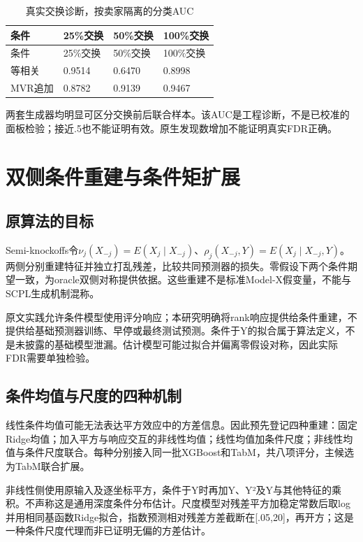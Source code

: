 \documentclass{sufethesismas}
\begin{document}
{
\footnotesize
\begin{longtable}[]{@{}llll@{}}
\caption{真实交换诊断，按卖家隔离的分类AUC}\tabularnewline
\toprule\noalign{}
条件 & 25\%交换 & 50\%交换 & 100\%交换 \\
\midrule\noalign{}
\endfirsthead
\toprule\noalign{}
条件 & 25\%交换 & 50\%交换 & 100\%交换 \\
\midrule\noalign{}
\endhead
\bottomrule\noalign{}
\endlastfoot
等相关 & 0.9514 & 0.6470 & 0.8998 \\
MVR追加 & 0.8782 & 0.9139 & 0.9467 \\
\end{longtable}
}

两套生成器均明显可区分交换前后联合样本。该AUC是工程诊断，不是已校准的面板检验；接近.5也不能证明有效。原生发现数增加不能证明真实FDR正确。

\chapter{双侧条件重建与条件矩扩展}

\section{原算法的目标}

Semi-knockoffs令\(\nu_j(X_{-j})=E(X_j\mid X_{-j})\)、\(\rho_j(X_{-j},Y)=E(X_j\mid X_{-j},Y)\)。两侧分别重建特征并独立打乱残差，比较共同预测器的损失。零假设下两个条件期望一致，为oracle双侧对称提供依据。这些重建不是标准Model-X假变量，不能与SCPL生成机制混称。

原文实践允许条件模型使用评分响应；本研究明确将rank响应提供给条件重建，不提供给基础预测器训练、早停或最终测试预测。条件于Y的拟合属于算法定义，不是未披露的基础模型泄漏。估计模型可能过拟合并偏离零假设对称，因此实际FDR需要单独检验。

\section{条件均值与尺度的四种机制}

线性条件均值可能无法表达平方效应中的方差信息。因此预先登记四种重建：固定Ridge均值；加入平方与响应交互的非线性均值；线性均值加条件尺度；非线性均值与条件尺度联合。每种分别接入同一批XGBoost和TabM，共八项评分，主候选为TabM联合扩展。

非线性侧使用原输入及逐坐标平方，条件于Y时再加Y、Y²及Y与其他特征的乘积。不声称这是通用深度条件分布估计。尺度模型对残差平方加稳定常数后取log并用相同基函数Ridge拟合，指数预测相对残差方差截断在{[}.05,20{]}，再开方；这是一种条件尺度代理而非已证明无偏的方差估计。
\end{document}
